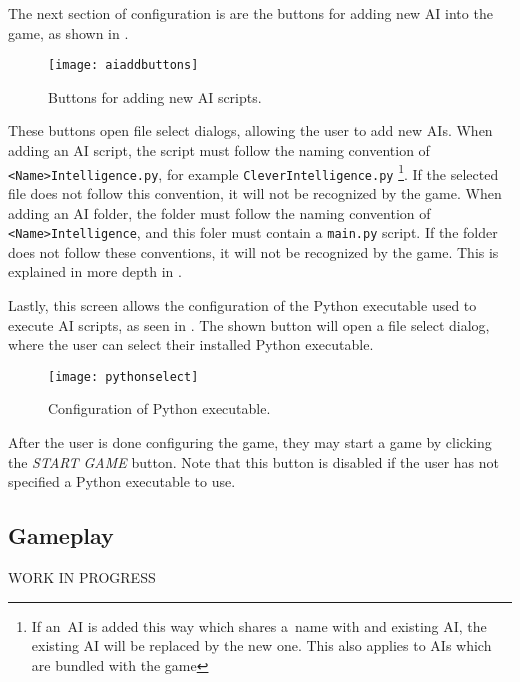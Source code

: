 The next section of configuration is are the buttons for adding new AI
into the game, as shown in .

\begin{figure}[ht]
\centerline{\mbox{\texttt{[image: aiaddbuttons]}}}
\caption{Buttons for adding new AI scripts.}\label{ud:aiaddbuttons}
\end{figure}

These buttons open file select dialogs, allowing the user to add new AIs.
When adding an AI script, the script must follow the naming convention
of \texttt{<Name>Intelligence.py}, for example \texttt{CleverIntelligence.py}
\footnote{If an~AI is added this way which shares a~name with and existing AI,
the existing AI will be replaced by the new one. This also applies to AIs which
are bundled with the game}.
If the selected file does not follow this convention, it will not be recognized
by the game.
When adding an AI folder, the folder must follow the naming convention of
\texttt{<Name>Intelligence}, and this foler must contain a \texttt{main.py}
script. If the folder does not follow these conventions, it will not be recognized
by the game. This is explained in more depth in .

Lastly, this screen allows the configuration of the Python executable used
to execute AI scripts, as seen in . The shown
button will open a file select dialog, where the user can select their
installed Python executable.

\begin{figure}[ht]
\centerline{\mbox{\texttt{[image: pythonselect]}}}
\caption{Configuration of Python executable.}\label{ud:pythonselect}
\end{figure}

After the user is done configuring the game, they may start a game by clicking the
\emph{START GAME} button. Note that this button is disabled if the user
has not specified a Python executable to use.

\subsection{Gameplay}

WORK IN PROGRESS
